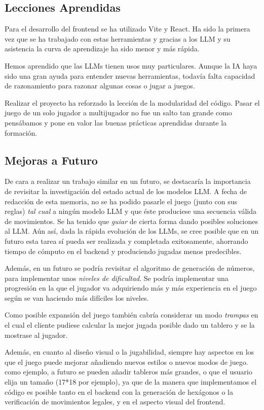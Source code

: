 \documentclass[12pt,epsf,titlepage,a4paper]{article}
\begin{document}
\subsection{Lecciones Aprendidas}

Para el desarrollo del frontend se ha utilizado Vite y React. Ha sido la primera vez que se ha trabajado con estas herramientas y gracias a los LLM y su asistencia la curva de aprendizaje ha sido menor y más rápida.

Hemos aprendido que las LLMs tienen usos muy particulares. Aunque la IA haya sido una gran ayuda para entender nuevas herramientas, todavía falta capacidad de razonamiento para razonar algunas cosas o jugar a juegos.

Realizar el proyecto ha reforzado la lección de la modularidad del código. Pasar el juego de un solo jugador a multijugador no fue un salto tan grande como pensábamos y pone en valor las buenas prácticas aprendidas durante la formación.

\subsection{Mejoras a Futuro} \label{potencial}

De cara a realizar un trabajo similar en un futuro, se destacaría la importancia de revisitar la investigación del estado actual de los modelos LLM. A fecha de redacción de esta memoria, no se ha podido pasarle el juego (junto con sus reglas) \emph{tal cual} a ningún modelo LLM y que éste produciese una secuencia válida de movimientos. Se ha tenido que \emph{guiar} de cierta forma dando posibles soluciones al LLM. Aún así, dada la rápida evolución de los LLMs, se cree posible que en un futuro esta tarea sí pueda ser realizada y completada exitosamente, ahorrando tiempo de cómputo en el backend y produciendo jugadas menos predecibles.

Además, en un futuro se podría revisitar el algoritmo de generación de números, para implementar unos \emph{niveles de dificultad}. Se podría implementar una progresión en la que el jugador va adquiriendo más y más experiencia en el juego según se van haciendo más difíciles los niveles.

Como posible expansión del juego también cabría considerar un modo \emph{trampas} en el cual el cliente pudiese calcular la mejor jugada posible dado un tablero y se la mostrase al jugador.

Además, en cuanto al diseño visual o la jugabilidad, siempre hay aspectos en los que el juego puede mejorar añadiendo nuevos estilos o nuevos modos de juego. como ejemplo, a futuro se pueden añadir tableros más grandes, o que el usuario elija un tamaño (17*18 por ejemplo), ya que de la manera que implementamos el código es posible tanto en el backend con la generación de hexágonos o la verificación de movimientos legales, y en el aspecto visual del frontend.
\end{document}
